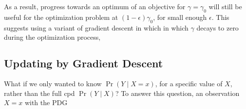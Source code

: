 \documentclass{article}
\theoremstyle{plain}
\newtheorem{claim}[theorem]{Claim}%
\theoremstyle{definition}
\theoremstyle{remark}
\newcommand\commentout[1]{}
\let\H\relax
\DeclareMathOperator{\H}{\mathrm{H}} %
\newcommand\mat[1]{\mathbf{#1}}
\newcommand{\thickD}{I\mkern-8muD}
\newcommand{\kldiv}{\thickD\infdivx}
\newcommand{\bp}[1][L]{\mat{p}_{\!_{#1}\!}}
\newcommand{\V}{\mathcal V}
\newcommand{\dg}[1]{\mathbdcal{#1}}
\newcommand\smid{\!\mid\!}
\newcommand{\pdgunit}{\mathrlap{\mathit 1} \mspace{2.3mu}\mathit 1}
\newcommand{\ed}[3]{%
		\mathchoice%
		{#2\overset{\smash{\mskip-5mu\raisebox{-3pt}{${#1}$}}}{\xrightarrow{\hphantom{\scriptstyle {#1}}}} #3} %
		{#2\overset{\smash{\mskip-5mu\raisebox{-3pt}{$\scriptstyle {#1}$}}}{\xrightarrow{\hphantom{\scriptstyle {#1}}}} #3}%
		{#2\overset{\smash{\mskip-5mu\raisebox{-3pt}{$\scriptscriptstyle {#1}$}}}{\xrightarrow{\hphantom{\scriptscriptstyle {#1}}}} #3} %
		{#2\overset{\smash{\mskip-5mu\raisebox{-3pt}{$\scriptscriptstyle {#1}$}}}{\xrightarrow{\hphantom{\scriptscriptstyle {#1}}}} #3}} %
\newcommand{\alle}[1][L]{_{\ed {#1}XY}}
\begin{document}
As a result, progress towards an optimum of an objective for $\gamma = \gamma_0$ will still be useful for the optimization problem at $(1-\epsilon)\gamma_0$, for small enough $\epsilon$.
This suggests using a variant of gradient descent in which
in which $\gamma$ decays to zero during the optimization process,




\commentout{%
	\begin{defn}[degree of inconsistency]
		If $\dg M$ is a PDG, let $\aar{\dg M}_\gamma$ denote the \emph{degree of
		inconsistency} of $\dg M$ at $\gamma$, and be given by
		$$ \aar{\dg M}_\gamma := \inf_{\mu \in \Delta[\V(\dg M)]}
			\sum\alle \beta_L \;\kldiv{\mu_{Y|X}}{\bp} + \alpha_L\;\H_\mu(Y\mid X)
		$$
		and let $\aar[\Big]{\dg M} = \lim_{\gamma\to 0^+} \aar{\dg M}_\gamma$.
	\end{defn}

	\begin{claim}
		$$\bbr{\dg M}_\gamma(\mu) = $$
	\end{claim}
}%



\subsection{Updating by Gradient Descent}
	\label{sec:inference-by-gd}

\commentout{
	If, rather than fixing $\dg M$ and optimizing $p$, we fix $p$ and optimize $\dg M$,
	this same proces corresponds to an update, rather than an inference. For instance, in
	the case where $X = \pdgunit$, an observation $Y\!=\!y$  can be added to
	$\dg M$ in the form of an edge $\ed{\delta_y}{\pdgunit}Y$, getting the
	(possibly inconsistent) PDG $\dg M'$. The distribution $\bbr{M'}^*$ turns out
	to be the result of conditioning $\bbr{\dg M}^*$ on $Y\!=\!y$.
}

What if we only wanted to know $\Pr(Y \smid X=x)$, for a specific value of $X$, rather than the full cpd $\Pr(Y\smid X)$?
To answer this question, an observation $X=x$ with the PDG
\end{document}
